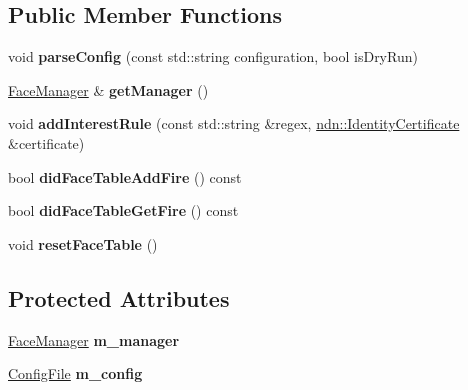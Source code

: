 \subsection*{Public Member Functions}
\begin{DoxyCompactItemize}
\item 
void {\bfseries parse\+Config} (const std\+::string configuration, bool is\+Dry\+Run)\hypertarget{classnfd_1_1tests_1_1FaceManagerFixture_af700f29f2418afd7e208b8b8138ee21b}{}\label{classnfd_1_1tests_1_1FaceManagerFixture_af700f29f2418afd7e208b8b8138ee21b}

\item 
\hyperlink{classnfd_1_1FaceManager}{Face\+Manager} \& {\bfseries get\+Manager} ()\hypertarget{classnfd_1_1tests_1_1FaceManagerFixture_ad6a0fc1fe23e245b9c7333f843d48bcd}{}\label{classnfd_1_1tests_1_1FaceManagerFixture_ad6a0fc1fe23e245b9c7333f843d48bcd}

\item 
void {\bfseries add\+Interest\+Rule} (const std\+::string \&regex, \hyperlink{classndn_1_1IdentityCertificate}{ndn\+::\+Identity\+Certificate} \&certificate)\hypertarget{classnfd_1_1tests_1_1FaceManagerFixture_a81c512486d818e9a4a3fbf05a26a2c25}{}\label{classnfd_1_1tests_1_1FaceManagerFixture_a81c512486d818e9a4a3fbf05a26a2c25}

\item 
bool {\bfseries did\+Face\+Table\+Add\+Fire} () const\hypertarget{classnfd_1_1tests_1_1FaceManagerFixture_a4651b7f67ce3cd25e6593eac70ed0425}{}\label{classnfd_1_1tests_1_1FaceManagerFixture_a4651b7f67ce3cd25e6593eac70ed0425}

\item 
bool {\bfseries did\+Face\+Table\+Get\+Fire} () const\hypertarget{classnfd_1_1tests_1_1FaceManagerFixture_afaeecc82eb20f92d57258aa6e651aba4}{}\label{classnfd_1_1tests_1_1FaceManagerFixture_afaeecc82eb20f92d57258aa6e651aba4}

\item 
void {\bfseries reset\+Face\+Table} ()\hypertarget{classnfd_1_1tests_1_1FaceManagerFixture_a7805c1c8b845726e5a2eea232b7b7ca0}{}\label{classnfd_1_1tests_1_1FaceManagerFixture_a7805c1c8b845726e5a2eea232b7b7ca0}

\end{DoxyCompactItemize}
\subsection*{Protected Attributes}
\begin{DoxyCompactItemize}
\item 
\hyperlink{classnfd_1_1FaceManager}{Face\+Manager} {\bfseries m\+\_\+manager}\hypertarget{classnfd_1_1tests_1_1FaceManagerFixture_a58db0070d7e2ccaa392d35f5f2a17bb9}{}\label{classnfd_1_1tests_1_1FaceManagerFixture_a58db0070d7e2ccaa392d35f5f2a17bb9}

\item 
\hyperlink{classnfd_1_1ConfigFile}{Config\+File} {\bfseries m\+\_\+config}\hypertarget{classnfd_1_1tests_1_1FaceManagerFixture_af558978b3bf0f74e1e0a520dd8e24ced}{}\label{classnfd_1_1tests_1_1FaceManagerFixture_af558978b3bf0f74e1e0a520dd8e24ced}

\end{DoxyCompactItemize}


